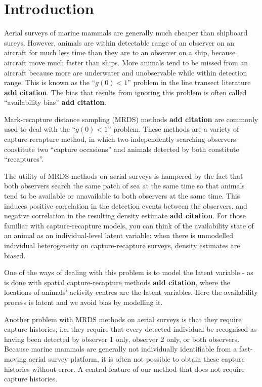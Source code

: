 \documentclass[useAMS, usenatbib, referee]{biom}
\begin{document}
\section{Introduction}\label{sec:intro}

Aerial surveys of marine mammals are generally much cheaper than shipboard sureys. However, animals are within detectable range of an observer on an aircraft for much less time than they are to an observer on a ship, because aircraft move much faster than ships. More animals tend to be missed from an aircraft because more are underwater and unobservable while within detection range. This is known as the ``$g(0)<1$'' problem in the line transect literature \textbf{add citation}. The bias that results from ignoring this problem is often called ``availability bias'' \textbf{add citation}.

Mark-recapture distance sampling (MRDS) methods \textbf{add citation} are commonly used to deal with the ``$g(0)<1$''  problem. These methods are a variety of capture-recapture method, in which two independently searching observers constitute two ``capture occasions'' and animals detected by both constitute ``recaptures''. 

The utility of MRDS methods on aerial surveys is hampered by the fact that both observers search the same patch of sea at the same time so that animals tend to be available or unavailable to both observers at the same time. This induces positive correlation in the detection events between the observers, and negative correlation in the resulting density estimate \textbf{add citation}. For those familiar with capture-recapture models, you can think of the availability state of an animal as an individual-level latent variable: when there is unmodelled individual heterogeneity on capture-recapture surveys, density estimates are biased. 

One of the ways of dealing with this problem is to model the latent variable - as is done with spatial capture-recapture methods \textbf{add citation}, where the locations of animals' activity centres are the latent variables. Here the availability process is latent and we avoid bias by modelling it.

Another problem with MRDS methods on aerial surveys is that they require capture histories, i.e. they require that every detected individual be recognised as having been detected by observer 1 only, observer 2 only, or both observers. Because marine mammals are generally not individually identifiable from a fast-moving aerial survey platform, it is often not possible to obtain these capture histories without error. A central feature of our method that does not require capture histories.
\end{document}
